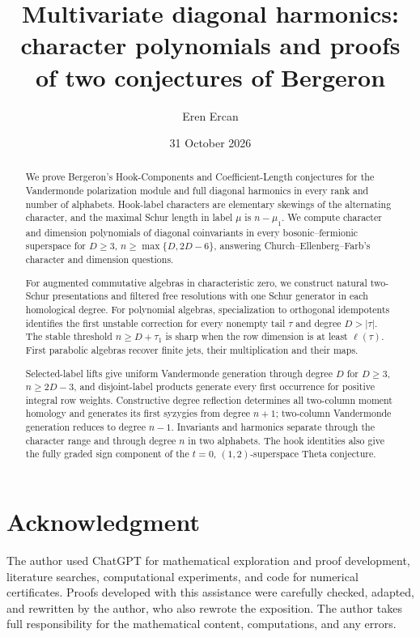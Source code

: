 \documentclass[11pt,a4paper]{amsart}
\title[Diagonal harmonics and character polynomials]{Multivariate diagonal harmonics: character polynomials and proofs of two conjectures of Bergeron}
\author{Eren Ercan}
\date{31 October 2026}
\numberwithin{equation}{section}
\theoremstyle{definition}
\theoremstyle{remark}
\begin{document}
\begin{abstract}
We prove Bergeron's Hook-Components and Coefficient-Length conjectures
for the Vandermonde polarization module and full diagonal harmonics in
every rank and number of alphabets. Hook-label characters are elementary
skewings of the alternating character, and the maximal Schur length in
label $\mu$ is $n-\mu_1$. We compute character and dimension polynomials
of diagonal coinvariants in every bosonic--fermionic superspace for
$D\ge3$, $n\ge\max\{D,2D-6\}$, answering Church--Ellenberg--Farb's
character and dimension questions.

For augmented commutative algebras in characteristic zero, we construct
natural two-Schur presentations and filtered free resolutions with one
Schur generator in each homological degree. For polynomial algebras,
specialization to orthogonal idempotents identifies the first unstable
correction for every nonempty tail $\tau$ and degree $D>|\tau|$.
The stable threshold $n\ge D+\tau_1$ is sharp when the row dimension
is at least $\ell(\tau)$. First parabolic algebras recover finite jets,
their multiplication and their maps.

Selected-label lifts give uniform Vandermonde generation through degree
$D$ for $D\ge3$, $n\ge2D-3$, and disjoint-label products generate every
first occurrence for positive integral row weights. Constructive degree
reflection determines all two-column moment homology and generates its
first syzygies from degree $n+1$; two-column Vandermonde generation reduces
to degree $n-1$. Invariants and harmonics separate through the character
range and through degree $n$ in two alphabets. The hook identities also
give the fully graded sign component of the $t=0$, $(1,2)$-superspace
Theta conjecture.
\end{abstract}
\maketitle


\setcounter{tocdepth}{1}
\tableofcontents











\appendix





\section*{Acknowledgment}
The author used ChatGPT for mathematical exploration and proof development, literature searches, computational experiments, and code for numerical certificates. Proofs developed with this assistance were carefully checked, adapted, and rewritten by the author, who also rewrote the exposition. The author takes full responsibility for the mathematical content, computations, and any errors.


\end{document}

